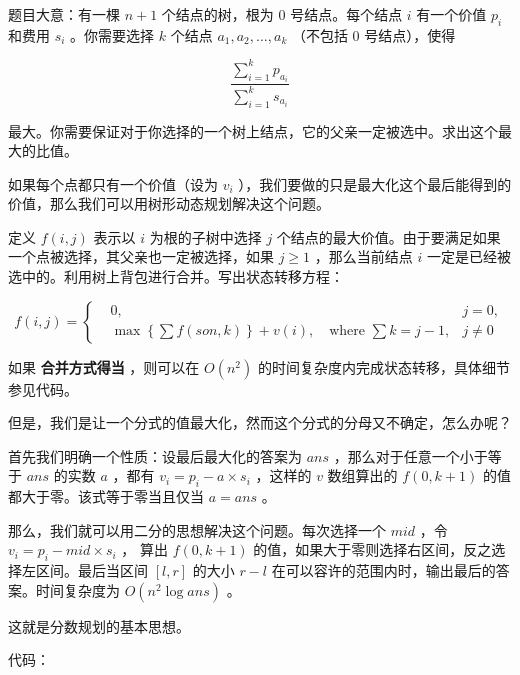 
\begin{NOTE}{}{}
题目大意：有一棵 $n+1$ 个结点的树，根为 $0$ 号结点。每个结点 $i$ 有一个价值 $p_i$ 和费用 $s_i$ 。你需要选择 $k$ 个结点 $a_1,a_2,\ldots,a_k$ （不包括 $0$ 号结点），使得

$$
\frac{\sum_{i=1}^k p_{a_i}}{\sum_{i=1}^k s_{a_i}}
$$

最大。你需要保证对于你选择的一个树上结点，它的父亲一定被选中。求出这个最大的比值。

\end{NOTE}


如果每个点都只有一个价值（设为 $v_i$ ），我们要做的只是最大化这个最后能得到的价值，那么我们可以用树形动态规划解决这个问题。

定义 $f(i,j)$ 表示以 $i$ 为根的子树中选择 $j$ 个结点的最大价值。由于要满足如果一个点被选择，其父亲也一定被选择，如果 $j\ge 1$ ，那么当前结点 $i$ 一定是已经被选中的。利用树上背包进行合并。写出状态转移方程：

$$
f(i,j)=\left\{
\begin{aligned}
& 0, & j=0, \\
& \max\left\{\sum f(son,k)\right\}+v(i),\quad\text{where }\sum k=j-1, & j\neq 0
\end{aligned} \right
.
$$

如果 \textbf{ 合并方式得当 } ，则可以在 $O(n^2)$ 的时间复杂度内完成状态转移，具体细节参见代码。

但是，我们是让一个分式的值最大化，然而这个分式的分母又不确定，怎么办呢？

首先我们明确一个性质：设最后最大化的答案为 $ans$ ，那么对于任意一个小于等于 $ans$ 的实数 $a$ ，都有 $v_i=p_i-a\times s_i$ ，这样的 $v$ 数组算出的 $f(0,k+1)$ 的值都大于零。该式等于零当且仅当 $a=ans$ 。

那么，我们就可以用二分的思想解决这个问题。每次选择一个 $mid$ ，令 $v_i=p_i-mid\times s_i$ ， 算出 $f(0,k+1)$ 的值，如果大于零则选择右区间，反之选择左区间。最后当区间 $[l,r]$ 的大小 $r-l$ 在可以容许的范围内时，输出最后的答案。时间复杂度为 $O(n^2\log ans)$ 。

这就是分数规划的基本思想。

代码：

